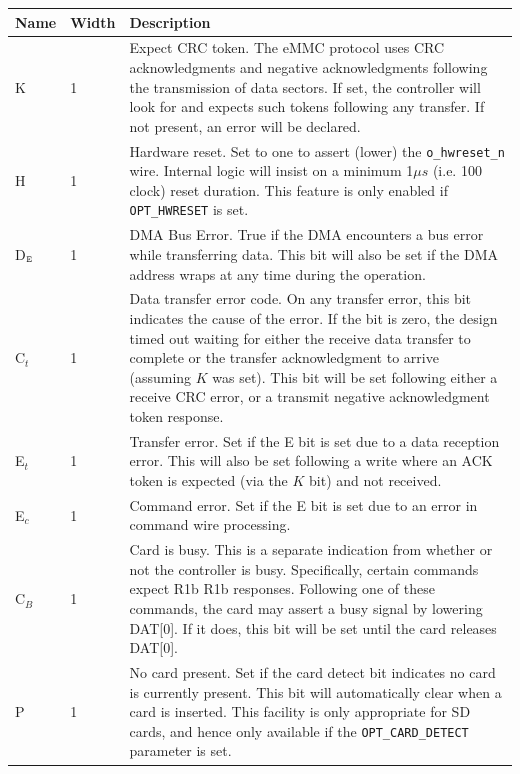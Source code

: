 \documentclass{gqtekspec}
\begin{document}
\begin{table}\begin{center}
\begin{tabular}{|p{1.2in}|p{0.5in}|p{4.0in}|}\hline
	\rowcolor[gray]{0.85} Name & Width & Description\\\hline\hline
K &1& Expect CRC token.  The eMMC protocol uses CRC
	acknowledgments and negative acknowledgments following the transmission
	of data sectors.  If set, the controller will look for and expects
	such tokens following any transfer.  If not present, an error will be
	declared.  \\
H &1& Hardware reset.  Set to one to assert (lower) the {\tt o\_hwreset\_n}
	wire.  Internal logic will insist on a minimum 1$\mu s$
	(i.e. 100 clock) reset duration.  This feature is only enabled if
	{\tt OPT\_HWRESET} is set.\\
D$_{\mbox{\tiny E}}$&1& DMA Bus Error.  True if the DMA encounters a bus error
	while transferring data.  This bit will also be set if the DMA address
	wraps at any time during the operation. \\
C$_t$&1& Data transfer error code.  On any transfer error, this bit indicates
	the cause of the error.  If the bit is zero, the design timed out
	waiting for either the receive data transfer to complete or the
	transfer acknowledgment to arrive (assuming $K$ was set).  This bit
	will be set following either a receive CRC error, or a transmit
	negative acknowledgment token response. \\
E$_t$&1& Transfer error.  Set if the E bit is set due to a data reception error.
	This will also be set following a write where an ACK token is expected
	(via the $K$ bit) and not received.
	\\
E$_c$&1& Command error.  Set if the E bit is set due to an error in command
	wire processing.  \\
C$_B$&1& Card is busy.  This is a separate indication from whether or not the
	controller is busy.  Specifically, certain commands expect R1b
	R1b responses.  Following one of these commands, the card may assert a
	busy signal by lowering DAT[0].  If it does, this bit will be set
	until the card releases DAT[0].\\
P & 1 & No card present.  Set if the card detect bit indicates no card is
	currently present.  This bit will automatically clear when a card
	is inserted.  This facility is only appropriate for SD cards, and hence
	only available if the {\tt OPT\_CARD\_DETECT} parameter is set.\\

\end{tabular}
\end{center}
\end{table}
\end{document}
